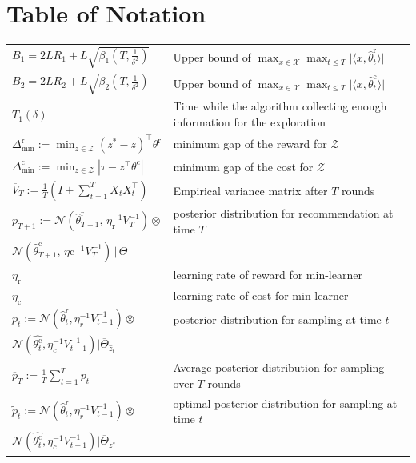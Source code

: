 \documentclass[accepted]{uai2025} %
\theoremstyle{plain}
\theoremstyle{definition}
\theoremstyle{remark}
\newcommand{\thetac}{\theta^{\mathrm{c}}}
\newcommand{\Deltac}{\Delta^{\mathrm{c}}}
\newcommand{\Deltar}{\Delta^{\mathrm{r}}}
\newcommand{\thetar}{\theta^{\mathrm{r}}}
\begin{document}
\section{Table of Notation}
\begin{table}[h!]
\renewcommand{\arraystretch}{1.5} %
\begin{tabular}{p{} | p{}}
\hline
$B_1= 2L R_1+L \sqrt{\beta_1(T, \frac{1}{\delta^2})}$ & Upper bound of $\max_{x \in \mathcal{X}} \max_{t \leq T} \lvert \langle x, \hat{\theta}^{\mathrm{r}}_t \rangle \rvert
$ \\
$B_2=2L R_2+L \sqrt{\beta_2(T, \frac{1}{\delta^2})}$ & Upper bound of $\max_{x \in \mathcal{X}} \max_{t \leq T} \lvert \langle x, \hat{\theta}^{\mathrm{c}}_t \rangle \rvert
$ \\
$T_1(\delta)$ & Time while the algorithm collecting enough information for the exploration
  \\
  $\Deltar_{\text{min}}:=\min_{z\in \mathcal{Z}} (z^*-z)^\top \thetar $ & minimum gap of the reward for $\mathcal{Z}$
  \\
    $\Deltac_{\text{min}}:=\min_{z\in \mathcal{Z}} |\tau-z^\top \thetac|$ & minimum gap of the cost for $\mathcal{Z}$
    \\
    $\overline{V}_T:=\frac{1}{T} (I+\sum_{t=1}^{T} X_t X_t^\top)$ & Empirical variance matrix after $T$ rounds
    \\
    $p_{T+1} := \mathcal{N}\left(\hat{\theta}^\mathrm{r}_{T+1}, \, \eta_\mathrm{r}^{-1} V_{T}^{-1} \right) \otimes$ &posterior distribution for recommendation at time $T$\\  $\mathcal{N}\left(\hat{\theta}^\mathrm{c}_{T+1}, \, \eta\mathrm{c}^{-1} V_{T}^{-1} \right) \, \Big| \, \Theta$
    \\
    $\eta_\mathrm{r}$ &learning rate of reward for min-learner
    \\
    $\eta_\mathrm{c}$ &learning rate of cost for min-learner
    \\
    $p_t := \mathcal{N}(\hat{\theta}^{\mathrm{r}}_t, \eta_r^{-1} V_{t-1}^{-1}) \otimes $ &posterior distribution for sampling at time $t$\\  
    $\mathcal{N}(\hat{\thetac_t}, \eta_c^{-1} V_{t-1}^{-1} ) | \overline{\Theta}_{\hat{z}_t}$
    \\
    $\overline{p}_T:=\frac{1}{T} \sum_{t=1}^T p_t$ & Average posterior distribution for sampling over $T$ rounds
    \\
    $\tilde{p}_t := \mathcal{N}(\hat{\theta}^{\mathrm{r}}_t, \eta_r^{-1} V_{t-1}^{-1}) \otimes $ &optimal posterior distribution for sampling at time $t$\\  
    $\mathcal{N}(\hat{\thetac_t}, \eta_c^{-1} V_{t-1}^{-1} ) | \overline{\Theta}_{z^*}$
    \\
\hline
\end{tabular}
\end{table}
\end{document}
